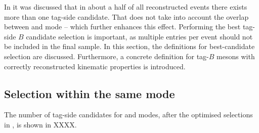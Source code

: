 In  it was discussed that in about a half of all reconstructed events there exists more than one tag-side candidate.
That does not take into account the overlap between \feiBp and \feiBz mode -- which further enhances this effect.
Performing the best tag-side $B$ candidate selection is important, as multiple entries per event should not be included in the final sample.
In this section, the definitions for best-candidate selection are discussed.
Furthermore, a concrete definition for tag-$B$ mesons with correctly reconstructed kinematic properties is introduced.

\subsection{Selection within the same \texorpdfstring{\FEI}{FEI} mode}

The number of tag-side candidates for \feiBp and \feiBz modes, after the optimised selections in ,
is shown in XXXX.